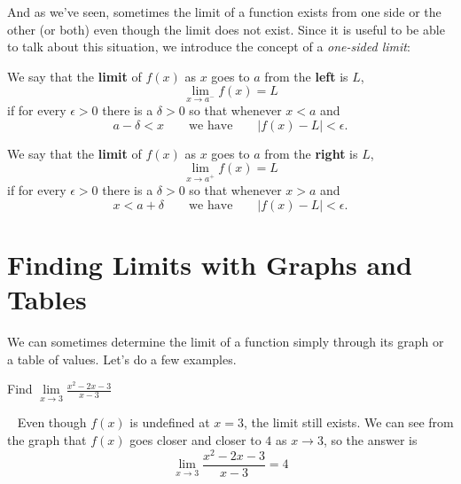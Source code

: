 And as we've seen, sometimes the limit of a function exists from one side or the other (or both) even though the limit does not exist. Since it is useful to be able to talk about this situation, we introduce the concept of a
\textit{one-sided limit}:

\begin{definition}
	We say that the \textbf{limit} of $f(x)$ as $x$ 
	goes to $a$ from the \textbf{left} is $L$,
	$$\lim_{x\to a^-}f(x)=L$$
	if for every $\epsilon>0$ there is a $\delta > 0$ so that 
	whenever $x< a$ and 
	$$a-\delta < x \qquad\text{we have}\qquad |f(x)-L|<\epsilon.$$

	We say that the \textbf{limit} of $f(x)$ as $x$ goes to $a$ 
	from the \textbf{right} is $L$,
	$$\lim_{x\to a^+}f(x)=L$$
	if for every $\epsilon>0$ there is a $\delta > 0$ so that 
	whenever $x > a$ and 
    $$x<a+\delta \qquad\text{we have}\qquad |f(x)-L|<\epsilon.$$ 
    \cite{mooc}
\end{definition}

\section{Finding Limits with Graphs and Tables}

We can sometimes determine the limit of a function simply through 
its graph or a table of values. Let's do a few examples.
~\\
\begin{example}
	Find $\displaystyle\lim\limits_{x\to 3} \frac{x^2 - 2x - 3}{x-3}$
    ~\newline
    \begin{figure}[H]
        \centering
        \label{plot:(x^2 - 3x + 2)/(x-2)}
    \end{figure}
	\begin{solution}~\newline
        Even though $f(x)$ is undefined at $x=3$, the limit still exists. We can see from the graph that $f(x)$ goes closer and closer to $4$ as $x\to 3$, so the answer is 
        $$\displaystyle\lim\limits_{x\to 3} \frac{x^2 - 2x - 3}{x-3} = 4$$
	\end{solution}
\end{example}

